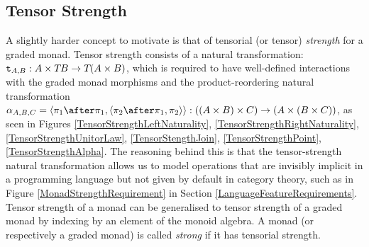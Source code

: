 \subsection{Tensor Strength}
A slightly harder concept to motivate is that of tensorial (or tensor) \textit{strength} for a graded monad. Tensor strength consists of a natural transformation: $\texttt{t}_{A, B}: A \times T_{}{B} \rightarrow T_{}{(A \times B)}$, which is required to have well-defined interactions with the graded monad morphisms and the product-reordering natural transformation $\alpha_{A, B, C} = \pr{\p\after\p}{\pr{\pp\after\p}{\pp}}: ((A \times B) \times C) \rightarrow (A \times (B \times C))$, as seen in Figures \ref{TensorStrengthLeftNaturality}, \ref{TensorStrengthRightNaturality}, \ref{TensorStrengthUnitorLaw}, \ref{TensorStengthJoin}, \ref{TensorStrengthPoint}, \ref{TensorStrengthAlpha}. The reasoning behind this is that the tensor-strength natural transformation allows us to model operations that are invisibly implicit in a programming language but not given by default in category theory, such as in Figure \ref{MonadStrengthRequirement} in Section \ref{LanguageFeatureRequirements}. Tensor strength of a monad can be generalised to tensor strength of a graded monad by indexing by an element of the monoid algebra. A monad (or respectively a graded monad) is called \textit{strong} if it has tensorial strength. 

